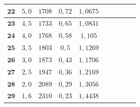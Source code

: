 \documentclass[11pt,a4paper]{article}
\begin{document}
\begin{table}[h!]
\begin{center}
\begin{tabular}{|c|c|c|c|c|c|c|c|c|c|}
$\textbf{22}$ & $	5,0	$	&	$	1708	$	&	$0,72	$	&	$	1,0675	$	\\ \hline
$\textbf{23}$ & $	4,5	$	&	$	1733	$	&	$0,65	$	&	$	1,0831	$	\\ \hline
$\textbf{24}$ & $	4,0	$	&	$	1768	$	&	$0,58	$	&	$	1,105	$	\\ \hline
$\textbf{25}$ & $	3,5	$	&	$	1803	$	&	$0,5	$	&	$	1,1269	$	\\ \hline
$\textbf{26}$ & $	3,0	$	&	$	1873	$	&	$0,43	$	&	$	1,1706	$	\\ \hline
$\textbf{27}$ & $	2,5	$	&	$	1947	$	&	$0,36	$	&	$	1,2169	$	\\ \hline
$\textbf{28}$ & $	2,0	$	&	$	2089	$	&	$0,29	$	&	$	1,3056	$	\\ \hline
$\textbf{29}$ & $	1,6	$	&	$	2310	$	&	$0,23	$	&	$	1,4438	$	\\ \hline
\end{tabular}
\end{center}
\end{table}
\end{document}
